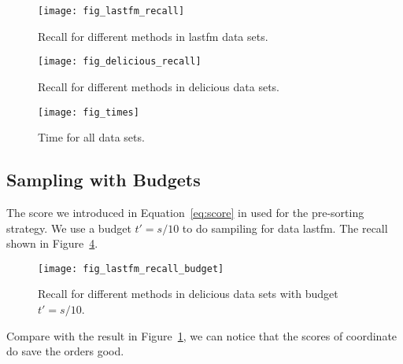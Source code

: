 \documentclass[letterpaper]{article}
\newcommand{\Eqn}[1]   {Equation~\ref{eq:#1}}
\newcommand{\Fig}[1]   {Figure~\ref{fig:#1}}
\begin{document}
\begin{figure}[]
  \centering
  \texttt{[image: fig\_lastfm\_recall]}\\
  \caption{Recall for different methods in lastfm data sets.}
  \label{fig:lastfm_recall}
\end{figure}
\begin{figure}[]
  \centering
  \texttt{[image: fig\_delicious\_recall]}\\
  \caption{Recall for different methods in delicious data sets.}
  \label{fig:delicious_recall}
\end{figure}
\begin{figure}[ht]
  \centering
  \texttt{[image: fig\_times]}\\
  \caption{Time for all data sets.}
  \label{fig:times}
\end{figure}
\subsection{Sampling with Budgets}
The score we introduced in \Eqn{score} in used for the pre-sorting strategy.
We use a budget $t' = s/10$ to do sampiling for data lastfm.
The recall shown in \Fig{budget}.
\begin{figure}[H]
  \centering
  \texttt{[image: fig\_lastfm\_recall\_budget]}\\
  \caption{Recall for different methods in delicious data sets with budget $t'=s/10$.}
  \label{fig:budget}
\end{figure}
Compare with the result in \Fig{lastfm_recall}, we can notice that the scores of coordinate
do save the orders good.
\end{document}
